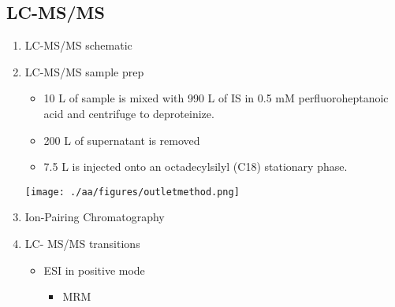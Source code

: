 \documentclass{scrartcl}
\begin{document}
\subsection{LC-MS/MS}
\label{sec:org7def4f2}
\begin{enumerate}
\item LC-MS/MS schematic
\label{sec:org2ab04f1}
\begin{center}
\end{center}


\item LC-MS/MS sample prep
\label{sec:org1bd7a92}
\begin{itemize}
\item 10 \textmu{}L of sample is mixed with 990 \textmu{}L of IS in 0.5 mM perfluoroheptanoic acid and centrifuge to deproteinize.
\item 200 \textmu{}L of supernatant is removed
\item 7.5 \textmu{}L is injected onto an octadecylsilyl (C18) stationary phase.
\end{itemize}


\begin{center}
\texttt{[image: ./aa/figures/outletmethod.png]}
\end{center}

\item Ion-Pairing Chromatography
\label{sec:org5b555e5}
\vspace{3em}

\item LC- MS/MS transitions
\label{sec:orgf38814b}
\begin{itemize}
\item ESI in positive mode
\begin{itemize}
\item MRM
\end{itemize}
\end{itemize}


\end{enumerate}
\end{document}
